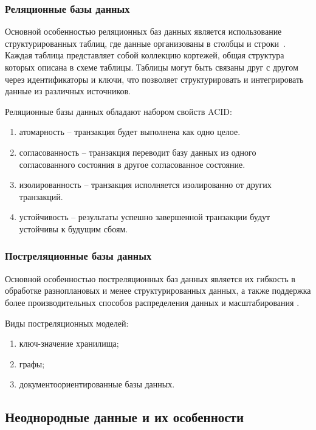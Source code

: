 \subsubsection{Реляционные базы данных}
 
Основной особенностью реляционных баз данных является использование структурированных таблиц, где данные организованы в столбцы и строки~\cite{kazan}.
Каждая таблица представляет собой коллекцию кортежей, общая структура которых описана в схеме таблицы. 
Таблицы могут быть связаны друг с другом через идентификаторы и ключи, что позволяет структурировать и интегрировать данные из различных источников.

Реляционные базы данных обладают набором свойств ACID:

\begin{enumerate}[leftmargin=1.6\parindent]
	\item атомарность -- транзакция будет выполнена как одно целое.
	\item согласованность -- транзакция переводит базу данных из одного согласованного состояния в другое согласованное состояние.
	\item изолированность -- транзакция исполняется изолированно от других транзакций.
	\item устойчивость -- результаты успешно завершенной транзакции будут устойчивы к будущим сбоям.
\end{enumerate}

\subsubsection{Постреляционные базы данных}

Основной особенностью постреляционных баз данных является их гибкость в обработке разноплановых и менее структурированных данных, а также поддержка более производительных способов распределения данных и масштабирования \cite{kazan}.

Виды постреляционных моделей:

\begin{enumerate}[leftmargin=1.6\parindent]
	\item ключ-значение хранилища;
	\item графы;
	\item документоориентированные базы данных.
\end{enumerate}

\clearpage
\subsection{Неоднородные данные и их особенности}

